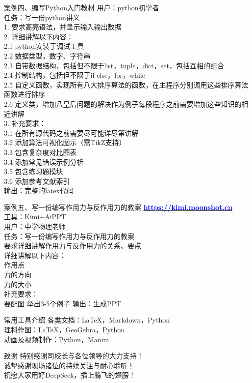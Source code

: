 \documentclass[aspectratio=169]{beamer}
\begin{document}
\begin{frame}[t]{案例四、编写Python入门教材}
\fontsize{9pt}{11pt}\selectfont
\alert{用户：python初学者}\\
\alert{任务：写一份python讲义}\\
1. 要求高亮语法，并显示输入输出数据\\
2. 详细讲解以下内容：\\
2.1 python安装于调试工具\\
2.2 数据类型，数字、字符串\\
2.3 自带数据结构，包括但不限于list，tuple，dict，set，包括互相的组合\\
2.4 控制结构，包括但不限于if else，for，while\\
2.5 自定义函数，实现所有八大排序算法的函数，在主程序分别调用这些排序算法函数进行排序\\
2.6 定义类，增加八皇后问题的解决作为例子每段程序之前需要增加这些知识的相近讲解\\
3. 补充要求：\\
3.1 在所有源代码之前需要尽可能详尽第讲解\\
3.2 添加算法可视化图示（需TikZ支持）\\
3.3 包含复杂度对比图表\\
3.4 添加常见错误示例分析\\
3.5 包含练习题模块\\
3.6 添加参考文献索引\\
\alert{输出：完整的latex代码}
\end{frame}

\begin{frame}[t]{案例五、写一份编写作用力与反作用力的教案}
\fontsize{9pt}{11pt}\selectfont
\underline{\Huge \textbf{\href{https://kimi.moonshot.cn}{\textcolor{blue}{https://kimi.moonshot.cn}}}}\\
工具：Kimi+AiPPT\\
\alert{用户：中学物理老师}\\
\alert{任务：写一份编写作用力与反作用力的教案}\\
要求详细讲解作用力与反作用力的关系、要点\\
详细讲解以下内容：\\
作用点\\
力的方向\\
力的大小\\
补充要求：\\
要配图
举出3-5个例子
\alert{输出：生成PPT}
\end{frame}

\begin{frame}[t]{常用工具介绍}
\fontsize{14pt}{18pt}\selectfont
各类文档：LaTeX，Markdown，Python \\
理科作图：LaTeX，GeoGebra，Python \\
动画及视频制作：Python，Manim \\
\end{frame}

\begin{frame}[t]{致谢}
\centering
\fontsize{14pt}{18pt}\selectfont
\vspace*{1.6cm}
特别感谢司校长与各位领导的大力支持！\\
\vspace*{0.4cm}
诚挚感谢现场诸位的持续关注与耐心聆听！\\
\vspace*{0.4cm}
祝愿大家用好DeepSeek，插上腾飞的翅膀！
\end{frame}
\end{document}
